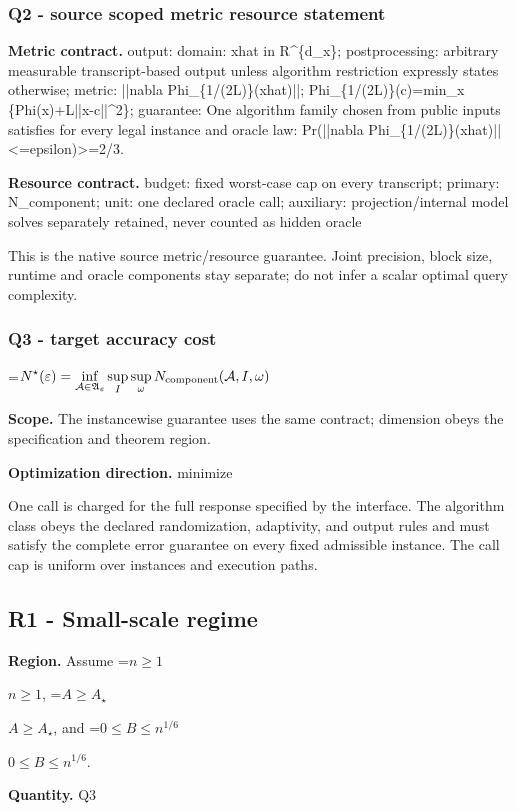 \documentclass[10pt,a4paper]{article}
\newcommand{\AtlasMath}[1]{\par\begingroup\centering\setbox0=\hbox{$\displaystyle #1$}\ifdim\wd0>1.4\linewidth\typeout{ATLAS WIDE FORMULA: \the\wd0}\fi\ifdim\wd0>\linewidth\resizebox{\linewidth}{!}{\box0}\else\box0\fi\par\endgroup}
\newcommand{\AtlasInlineMath}[1]{\begingroup\setbox0=\hbox{$#1$}\ifdim\wd0>.4\linewidth\endgroup\AtlasMath{#1}\else\endgroup$#1$\fi}
\begin{document}
\subsubsection{Q2 - source scoped metric resource statement}
\textbf{Metric contract.} output: domain: xhat in R\textasciicircum{}\{d\_x\}; postprocessing: arbitrary measurable transcript-based output unless algorithm restriction expressly states otherwise; metric: ||nabla Phi\_\{1/(2L)\}(xhat)||; Phi\_\{1/(2L)\}(c)=min\_x \{Phi(x)+L||x-c||\textasciicircum{}2\}; guarantee: One algorithm family chosen from public inputs satisfies for every legal instance and oracle law: Pr(||nabla Phi\_\{1/(2L)\}(xhat)||<=epsilon)>=2/3.

\textbf{Resource contract.} budget: fixed worst-case cap on every transcript; primary: N\_component; unit: one declared oracle call; auxiliary: projection/internal model solves separately retained, never counted as hidden oracle

This is the native source metric/resource guarantee. Joint precision, block size, runtime and oracle components stay separate; do not infer a scalar optimal query complexity.

\subsubsection{Q3 - target accuracy cost}
\AtlasMath{N^\star(\varepsilon)=\inf_{\mathcal A\in\mathfrak A_\varepsilon}\sup_I \sup_\omega N_{\rm component}(\mathcal A,I,\omega)}
\textbf{Scope.} The instancewise guarantee uses the same contract; dimension obeys the specification and theorem region.

\textbf{Optimization direction.} minimize

One call is charged for the full response specified by the interface. The algorithm class obeys the declared randomization, adaptivity, and output rules and must satisfy the complete error guarantee on every fixed admissible instance. The call cap is uniform over instances and execution paths.

\subsection{R1 - Small-scale regime}
\textbf{Region.} Assume \AtlasInlineMath{n\ge1}, \AtlasInlineMath{A\ge A_\star}, and \AtlasInlineMath{0\le B\le n^{1/6}}.

\textbf{Quantity.} Q3
\end{document}
